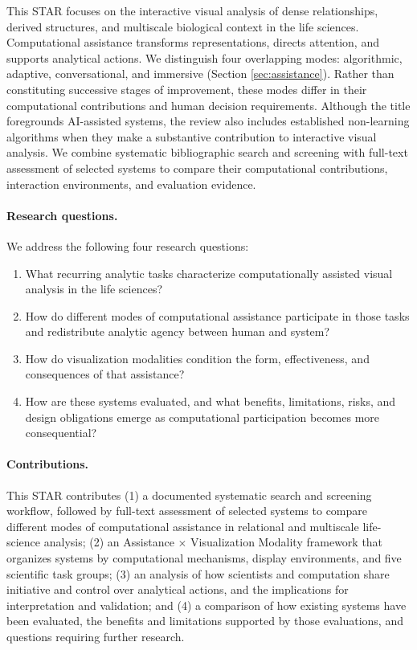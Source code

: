 This STAR focuses on the interactive visual analysis of dense relationships, derived structures, and multiscale biological context in the life sciences. Computational assistance transforms representations, directs attention, and supports analytical actions. We distinguish four overlapping modes: algorithmic, adaptive, conversational, and immersive (Section \ref{sec:assistance}). Rather than constituting successive stages of improvement, these modes differ in their computational contributions and human decision requirements. Although the title foregrounds AI-assisted systems, the review also includes established non-learning algorithms when they make a substantive contribution to interactive visual analysis. We combine systematic bibliographic search and screening with full-text assessment of selected systems to compare their computational contributions, interaction environments, and evaluation evidence.

\paragraph*{Research questions.}
We address the following four research questions:
\begin{enumerate}
\item[\textbf{RQ1.}] What recurring analytic tasks characterize computationally assisted visual analysis in the life sciences?
\item[\textbf{RQ2.}] How do different modes of computational assistance participate in those tasks and redistribute analytic agency between human and system?
\item[\textbf{RQ3.}] How do visualization modalities condition the form, effectiveness, and consequences of that assistance?
\item[\textbf{RQ4.}] How are these systems evaluated, and what benefits, limitations, risks, and design obligations emerge as computational participation becomes more consequential?
\end{enumerate}

\paragraph*{Contributions.}
This STAR contributes (1) a documented systematic search and screening workflow, followed by full-text assessment of selected systems to compare different modes of computational assistance in relational and multiscale life-science analysis; (2) an Assistance $\times$ Visualization Modality framework that organizes systems by computational mechanisms, display environments, and five scientific task groups; (3) an analysis of how scientists and computation share initiative and control over analytical actions, and the implications for interpretation and validation; and (4) a comparison of how existing systems have been evaluated, the benefits and limitations supported by those evaluations, and questions requiring further research.

